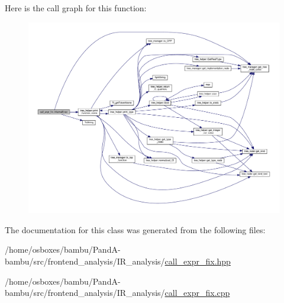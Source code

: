 Here is the call graph for this function\+:
\nopagebreak
\begin{figure}[H]
\begin{center}
\leavevmode
\includegraphics[width=350pt]{dc/d11/classcall__expr__fix_a4aa8f0db73ae82fe5de110e96185355e_cgraph}
\end{center}
\end{figure}


The documentation for this class was generated from the following files\+:\begin{DoxyCompactItemize}
\item 
/home/osboxes/bambu/\+Pand\+A-\/bambu/src/frontend\+\_\+analysis/\+I\+R\+\_\+analysis/\hyperlink{call__expr__fix_8hpp}{call\+\_\+expr\+\_\+fix.\+hpp}\item 
/home/osboxes/bambu/\+Pand\+A-\/bambu/src/frontend\+\_\+analysis/\+I\+R\+\_\+analysis/\hyperlink{call__expr__fix_8cpp}{call\+\_\+expr\+\_\+fix.\+cpp}\end{DoxyCompactItemize}
